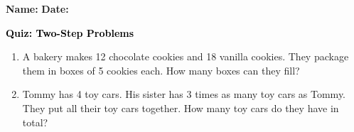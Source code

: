 \documentclass[12pt, letterpaper, fleqn]{article}
\begin{document}
\textbf{Name:} \underline{\hspace{5cm}}
\hfill
\textbf{Date:} \underline{\hspace{3cm}}\\

\begin{tcolorbox}[colback=customteal!20]
    \large\textcolor{black}{\textbf{Quiz: Two-Step Problems}}
\end{tcolorbox}

\vspace{5mm}
\begin{enumerate}[itemsep=4.5cm, leftmargin=0.6cm]
\item A bakery makes 12 chocolate cookies and 18 vanilla cookies. They package them in boxes of 5 cookies each. How many boxes can they fill?

\item Tommy has 4 toy cars. His sister has 3 times as many toy cars as Tommy. They put all their toy cars together. How many toy cars do they have in total?

\end{enumerate}
\end{document}
